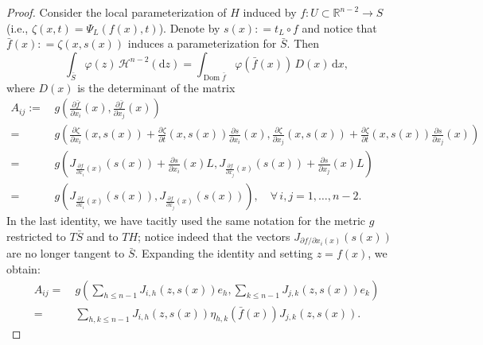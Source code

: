 \documentclass[12pt,a4paper]{amsart}
\theoremstyle{plain}
\theoremstyle{definition}
\numberwithin{equation}{section}
\let\phi\varphi
\newcommand{\R}{\mathbb{R}}
\DeclareMathOperator{\dom}{Dom}
\newcommand{\de}{{\mathrm{d}}}
\newcommand{\haus}{\mathcal{H}}
\newcommand{\gflow}{\Psi}
\newcommand{\lparam}{\zeta}
\begin{document}
\begin{proof}
Consider the local parameterization of $H$ induced by  $f:U\subset \R^{n-2} \to S$ (i.e., $\lparam(x,t)=\gflow_L(f(x),t)$). 
Denote by $s(x) : =t_L\circ f$ and notice that $\bar{f}(x): =\lparam(x,s(x))$ induces a parameterization for $\bar{S}$.
Then
  \begin{equation}
    \label{eq:cross-section-coordinates}
    \int_{\bar S}
    \phi(z)
    \,
    \haus^{n-2}(\de z)
    =
    \int_{\dom \bar{f}}
    \phi(\bar{f}(x))
    \,
    D(x)
    \,
    \de x
    ,
  \end{equation}
  where $D(x)$ is the determinant of the matrix
  \begin{equation}
    \begin{aligned}
    A_{ij}
    :=\,
    &
    g\left(
      \frac{\partial \bar{f}}{\partial x_i}(x)
      ,
      \frac{\partial \bar{f}}{\partial x_j}(x)
    \right)
    \\
    =\,
    &
    g\left(
      \frac{\partial \lparam}{\partial x_i}(x,s(x))
      +
      \frac{\partial \lparam}{\partial t}(x,s(x))      \frac{\partial s}{\partial x_i}(x)
      ,
      \frac{\partial \lparam}{\partial x_j}(x,s(x))
      +
      \frac{\partial \lparam}{\partial t}(x,s(x))      \frac{\partial s}{\partial x_j}(x)
    \right)
    \\
    =\,
    &
    g\left(
      J_{\frac{\partial f}{\partial x_i}(x)}(s(x))
      +
      \frac{\partial s}{\partial x_i}(x)
      L
      ,
      J_{\frac{\partial f}{\partial x_j}(x)}(s(x))
      +
      \frac{\partial s}{\partial x_j}(x)
      L
      \right)
      \\
      =\,
      &
        g\left(
      J_{\frac{\partial f}{\partial x_i}(x)}(s(x))
      ,
      J_{\frac{\partial f}{\partial x_j}(x)}(s(x))
    \right), \quad \forall\, i, j = 1,\dots, n-2.
\end{aligned}
\end{equation}
 In the last identity, we have tacitly used the same notation for the metric $g$ restricted to $T\bar S$ and to $TH$; 
notice indeed that the  vectors $J_{{\partial f / \partial x_i}(x)}(s(x))$ are no longer tangent to $\bar S$.
%
Expanding the identity and setting $z = f(x)$, we obtain: 
%
\begin{align*}
 A_{ij} =      &~   g\left( \sum_{h \leq n-1}J_{i,h}(z,s(x)) e_{h} , \sum_{k \leq n-1} J_{j,k}(z,s(x)) e_{k}    \right) \\ 
      =      &~ \sum_{h,k \leq n-1} J_{i,h} (z,s(x)) \eta_{h,k}(\bar f (x)) J_{j,k}(z,s(x)).
\end{align*}

\end{proof}
\end{document}
